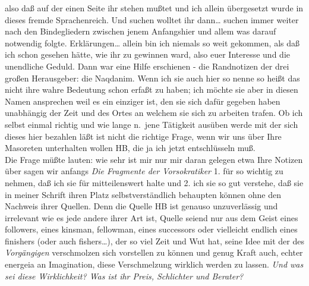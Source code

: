 \documentclass[
]{article}
\begin{document}
also daß auf der einen Seite ihr stehen mußtet und ich allein
übergesetzt wurde in dieses fremde Sprachenreich. Und suchen wolltet ihr
dann\ldots{} suchen immer weiter nach den Bindegliedern zwischen jenem
Anfangshier und allem was darauf notwendig folgte. Erklärungen\ldots{}
allein bin ich niemals so weit gekommen, als daß ich schon gesehen
hätte, wie ihr zu gewinnen ward, also euer Interesse und die unendliche
Geduld. Dann war eine Hilfe erschienen - die Randnotizen der drei großen
Herausgeber: die Naqdanim. Wenn ich sie auch hier so nenne so heißt das
nicht ihre wahre Bedeutung schon erfaßt zu haben; ich möchte sie aber in
diesen Namen ansprechen weil es ein einziger ist, den sie sich dafür
gegeben haben unabhängig der Zeit und des Ortes an welchem sie sich zu
arbeiten trafen. Ob ich selbst einmal richtig und wie lange n.~jene
Tätigkeit ausüben werde mit der sich dieses hier bezahlen läßt ist nicht
die richtige Frage, wenn wir uns über Ihre Masoreten unterhalten wollen
HB, die ja ich jetzt entschlüsseln muß.\\
Die Frage müßte lauten: wie sehr ist mir nur mir daran gelegen etwa Ihre
Notizen über sagen wir anfangs \emph{Die Fragmente der Vorsokratiker} 1.
für so wichtig zu nehmen, daß ich sie für mitteilenswert halte und 2.
ich sie so gut verstehe, daß sie in meiner Schrift ihren Platz
selbstverständlich behaupten können ohne den Nachweis ihrer Quellen.
Denn die Quelle HB ist genauso unzuverlässig und irrelevant wie es jede
andere ihrer Art ist, Quelle seiend nur aus dem Geist eines followers,
eines kinsman, fellowman, eines successors oder vielleicht endlich eines
finishers (oder auch fishers\ldots), der so viel Zeit und Wut hat, seine
Idee mit der des \emph{Vorgängigen} verschmolzen sich vorstellen zu
können und genug Kraft auch, echter energeia an Imagination, diese
Verschmelzung wirklich werden zu lassen. \emph{Und was sei diese
Wirklichkeit? Was ist ihr Preis, Schlichter und Berater? }
\end{document}
